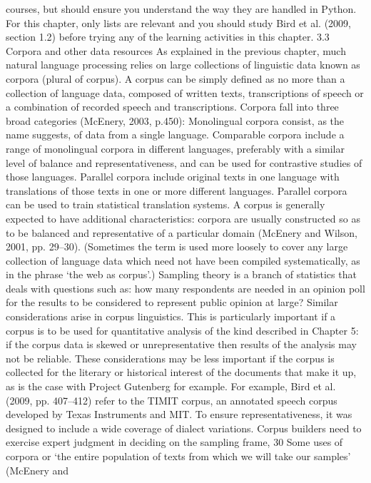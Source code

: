 courses, but should ensure you understand the way they are handled in Python. For
this chapter, only lists are relevant and you should study Bird et al. (2009, section
1.2) before trying any of the learning activities in this chapter.
3.3 Corpora and other data resources
As explained in the previous chapter, much natural language processing relies on
large collections of linguistic data known as corpora (plural of corpus). A corpus can
be simply defined as no more than a collection of language data, composed of
written texts, transcriptions of speech or a combination of recorded speech and
transcriptions.
Corpora fall into three broad categories (McEnery, 2003, p.450):
Monolingual corpora consist, as the name suggests, of data from a single
language.
Comparable corpora include a range of monolingual corpora in different
languages, preferably with a similar level of balance and representativeness, and
can be used for contrastive studies of those languages.
Parallel corpora include original texts in one language with translations of those
texts in one or more different languages. Parallel corpora can be used to train
statistical translation systems.
A corpus is generally expected to have additional characteristics: corpora are usually
constructed so as to be balanced and representative of a particular domain (McEnery
and Wilson, 2001, pp. 29–30). (Sometimes the term is used more loosely to cover
any large collection of language data which need not have been compiled
systematically, as in the phrase ‘the web as corpus’.) Sampling theory is a branch of
statistics that deals with questions such as: how many respondents are needed in an
opinion poll for the results to be considered to represent public opinion at large?
Similar considerations arise in corpus linguistics. This is particularly important if a
corpus is to be used for quantitative analysis of the kind described in Chapter 5: if
the corpus data is skewed or unrepresentative then results of the analysis may not be
reliable. These considerations may be less important if the corpus is collected for the
literary or historical interest of the documents that make it up, as is the case with
Project Gutenberg for example.
For example, Bird et al. (2009, pp. 407–412) refer to the TIMIT corpus, an annotated
speech corpus developed by Texas Instruments and MIT. To ensure
representativeness, it was designed to include a wide coverage of dialect variations.
Corpus builders need to exercise expert judgment in deciding on the sampling frame,
30
Some uses of corpora
or ‘the entire population of texts from which we will take our samples’ (McEnery and
